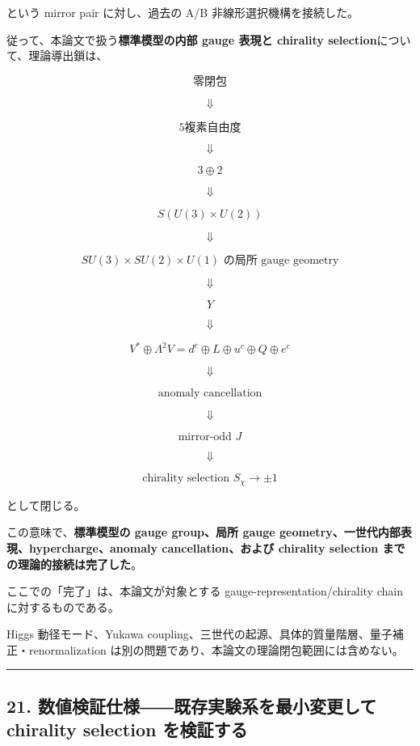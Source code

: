 \documentclass[
  a4paper,
]{ltjsarticle}
\begin{document}
という mirror pair に対し、過去の A/B 非線形選択機構を接続した。

従って、本論文で扱う\textbf{標準模型の内部 gauge 表現と chirality
selection}について、理論導出鎖は、

\[
\boxed{
\text{零閉包}
}
\]

\[
\Downarrow
\]

\[
\boxed{
5\text{複素自由度}
}
\]

\[
\Downarrow
\]

\[
\boxed{
3\oplus2
}
\]

\[
\Downarrow
\]

\[
\boxed{
S(U(3)\times U(2))
}
\]

\[
\Downarrow
\]

\[
\boxed{
SU(3)\times SU(2)\times U(1)
\text{ の局所 gauge geometry}
}
\]

\[
\Downarrow
\]

\[
\boxed{
Y
}
\]

\[
\Downarrow
\]

\[
\boxed{
V^*\oplus\Lambda^2V
=
d^c\oplus L\oplus u^c\oplus Q\oplus e^c
}
\]

\[
\Downarrow
\]

\[
\boxed{
\text{anomaly cancellation}
}
\]

\[
\Downarrow
\]

\[
\boxed{
\text{mirror-odd }J
}
\]

\[
\Downarrow
\]

\[
\boxed{
\text{chirality selection }S_\chi\to\pm1
}
\tag{172}
\]

として閉じる。

この意味で、\textbf{標準模型の gauge group、局所 gauge
geometry、一世代内部表現、hypercharge、anomaly cancellation、および
chirality selection までの理論的接続は完了した}。

ここでの「完了」は、本論文が対象とする gauge-representation/chirality
chain に対するものである。

Higgs 動径モード、Yukawa
coupling、三世代の起源、具体的質量階層、量子補正・renormalization
は別の問題であり、本論文の理論閉包範囲には含めない。

\begin{center}\rule{0.5\linewidth}{0.5pt}\end{center}

\subsection{21. 数値検証仕様――既存実験系を最小変更して chirality
selection
を検証する}\label{ux6570ux5024ux691cux8a3cux4ed5ux69d8ux65e2ux5b58ux5b9fux9a13ux7cfbux3092ux6700ux5c0fux5909ux66f4ux3057ux3066-chirality-selection-ux3092ux691cux8a3cux3059ux308b}
\end{document}
